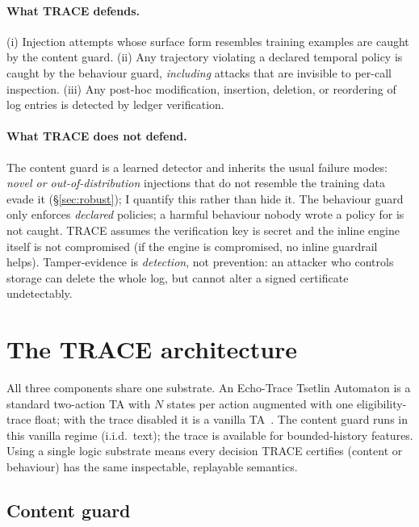 \documentclass[11pt]{article}
\begin{document}
\paragraph{What TRACE defends.} (i) Injection attempts whose surface form
resembles training examples are caught by the content guard. (ii) Any trajectory
violating a declared temporal policy is caught by the behaviour guard,
\emph{including} attacks that are invisible to per-call inspection. (iii) Any
post-hoc modification, insertion, deletion, or reordering of log entries is
detected by ledger verification.

\paragraph{What TRACE does not defend.} The content guard is a learned detector
and inherits the usual failure modes: \emph{novel or out-of-distribution}
injections that do not resemble the training data evade it (\S\ref{sec:robust});
I quantify this rather than hide it. The behaviour guard only enforces \emph{declared} policies;
a harmful behaviour nobody wrote a policy for is not caught. TRACE assumes the
verification key is secret and the inline engine itself is not compromised
(if the engine is compromised, no inline guardrail helps). Tamper-evidence is
\emph{detection}, not prevention: an attacker who controls storage can delete the
whole log, but cannot alter a signed certificate undetectably.

\section{The TRACE architecture}
\label{sec:arch}

All three components share one substrate. An Echo-Trace Tsetlin Automaton is a
standard two-action TA with $N$ states per action augmented with one
eligibility-trace float; with the trace disabled it is a vanilla
TA~\citep{granmo2018tsetlin}. The content guard runs in this vanilla regime
(i.i.d.\ text); the trace is available for bounded-history features. Using a
single logic substrate means every decision TRACE certifies (content or
behaviour) has the same inspectable, replayable semantics.

\subsection{Content guard}
\label{sec:content}
\end{document}
